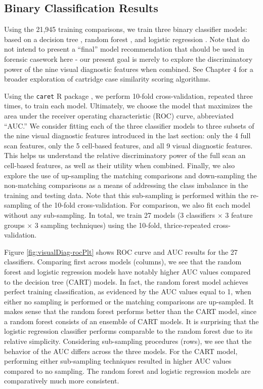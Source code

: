 \documentclass[11pt,]{isuthesis}
\begin{document}
\hypertarget{binary-classification-results}{%
\subsection{Binary Classification Results}\label{binary-classification-results}}

Using the 21,945 training comparisons, we train three binary classifier models: based on a decision tree \citep{Breiman2017, rpart}, random forest \citep{breiman, randomForest}, and logistic regression \citep{stats}.
Note that do not intend to present a ``final'' model recommendation that should be used in forensic casework here - our present goal is merely to explore the discriminatory power of the nine visual diagnostic features when combined.
See Chapter 4 for a broader exploration of cartridge case similarity scoring algorithms.

Using the \texttt{caret} R package \citep{caret}, we perform 10-fold cross-validation, repeated three times, to train each model.
Ultimately, we choose the model that maximizes the area under the receiver operating characteristic (ROC) curve, abbreviated ``AUC.''
We consider fitting each of the three classifier models to three subsets of the nine visual diagnostic features introduced in the last section: only the 4 full scan features, only the 5 cell-based features, and all 9 visual diagnostic features.
This helps us understand the relative discriminatory power of the full scan an cell-based features, as well as their utility when combined.
Finally, we also explore the use of up-sampling the matching comparisons and down-sampling the non-matching comparisons as a means of addressing the class imbalance in the training and testing data.
Note that this sub-sampling is performed within the re-sampling of the 10-fold cross-validation.
For comparison, we also fit each model without any sub-sampling.
In total, we train 27 models (3 classifiers \(\times\) 3 feature groups \(\times\) 3 sampling techniques) using the 10-fold, thrice-repeated cross-validation.

Figure \ref{fig:visualDiag-rocPlt} shows ROC curve and AUC results for the 27 classifiers.
Comparing first across models (columns), we see that the random forest and logistic regression models have notably higher AUC values compared to the decision tree (CART) models.
In fact, the random forest model achieves perfect training classification, as evidenced by the AUC values equal to 1, when either no sampling is performed or the matching comparisons are up-sampled.
It makes sense that the random forest performs better than the CART model, since a random forest consists of an ensemble of CART models.
It is surprising that the logistic regression classifier performs comparable to the random forest due to its relative simplicity.
Considering sub-sampling procedures (rows), we see that the behavior of the AUC differs across the three models.
For the CART model, performing either sub-sampling techniques resulted in higher AUC values compared to no sampling.
The random forest and logistic regression models are comparatively much more consistent.
\end{document}
